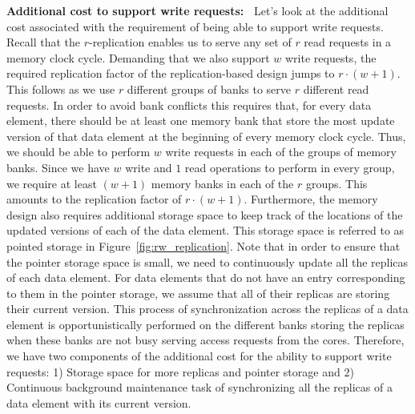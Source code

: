 \noindent \textbf{Additional cost to support write requests:~} Let's look at the additional cost associated with the requirement of being able to support write requests. Recall that the $r$-replication enables us to serve any set of $r$ read requests in a memory clock cycle. Demanding that we also support $w$ write requests, the required replication factor of the replication-based design jumps to $r\cdot(w + 1)$. This follows as we use $r$ different groups of banks to serve $r$ different read requests. In order to avoid bank conflicts this requires that, for every data element, there should be at least one memory bank that store the most update version of that data element at the beginning of every memory clock cycle. Thus, we should be able to perform $w$ write requests in each of the groups of memory banks. Since we have $w$ write and $1$ read operations to perform in every group, we require at least $(w + 1)$ memory banks in each of the $r$ groups. This amounts to the replication factor of $r\cdot(w +1)$. Furthermore, the memory design also requires additional storage space to keep track of the locations of the updated versions of each of the data element. This storage space is referred to as pointed storage in Figure~\ref{fig:rw_replication}.  Note that in order to ensure that the pointer storage space is small, we need to continuously update all the replicas of each data element. For data elements that do not have an entry corresponding to them in the pointer storage, we assume that all of their replicas are storing their current version. This process of synchronization across the replicas of a data element is opportunistically performed on the different banks storing the replicas when these banks are not busy serving access requests from the cores. Therefore, we have two components of the additional cost for the ability to support write requests: 1) Storage space for more replicas and pointer storage and  2) Continuous background maintenance task of synchronizing all the replicas of a data element with its current version. 

